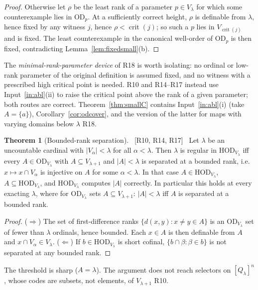\documentclass[11pt,letterpaper]{article}
\theoremstyle{definition}
\newtheorem{theorem}[definition]{Theorem}
\numberwithin{equation}{section}
\newcommand{\HOD}{\mathrm{HOD}}
\newcommand{\OD}{\mathrm{OD}}
\newcommand{\crit}{\operatorname{crit}}
\newcommand{\src}[1]{\unskip\ {\normalfont\small\sffamily\color{Olive}[#1]}\ }
\newcommand{\R}[1]{\textsf{R#1}}
\begin{document}
\begin{proof}
Otherwise let $\rho$ be the least rank of a parameter $p\in V_\lambda$ for which some counterexample lies in $\OD_p$. At a sufficiently correct height, $\rho$ is definable from $\lambda$, hence fixed by any witness $j$, hence $\rho<\crit(j)$; so such a $p$ lies in $V_{\crit(j)}$ and is fixed. The least counterexample in the canonical well-order of $\OD_p$ is then fixed, contradicting Lemma~\ref{lem:fixedsmall}(b).
\end{proof}

The \emph{minimal-rank-parameter device} of \R{18} is worth isolating: no ordinal or low-rank parameter of the original definition is assumed fixed, and no witness with a prescribed high critical point is needed. \R{10} and \R{14}--\R{17} instead use Input~\ref{in:abl}(ii) to raise the critical point above the rank of a given parameter; both routes are correct. Theorem~\ref{thm:smallC} contains Input~\ref{in:abl}(i) (take $A=\{a\}$), Corollary~\ref{cor:odcover}, and the version of the latter for maps with varying domains below $\lambda$ \R{18}.

\begin{theorem}[Bounded-rank separation]\label{thm:pinning}\src{R10, R14, R17}
Let $\lambda$ be an uncountable cardinal with $|V_\alpha|<\lambda$ for all $\alpha<\lambda$. Then $\lambda$ is regular in $\HOD_{V_\lambda}$ iff every $A\in\OD_{V_\lambda}$ with $A\subseteq V_{\lambda+1}$ and $|A|<\lambda$ is separated at a bounded rank, i.e.\ $x\mapsto x\cap V_\alpha$ is injective on $A$ for some $\alpha<\lambda$. In that case $A\in\HOD_{V_\lambda}$, $A\subseteq\HOD_{V_\lambda}$, and $\HOD_{V_\lambda}$ computes $|A|$ correctly. In particular this holds at every exacting $\lambda$, where for $\OD_{V_\lambda}$ sets $A\subseteq V_{\lambda+1}$: $|A|<\lambda$ iff $A$ is separated at a bounded rank.
\end{theorem}

\begin{proof}
($\Rightarrow$) The set of first-difference ranks $\{d(x,y):x\ne y\in A\}$ is an $\OD_{V_\lambda}$ set of fewer than $\lambda$ ordinals, hence bounded. Each $x\in A$ is then definable from $A$ and $x\cap V_\alpha\in V_\lambda$. ($\Leftarrow$) If $b\in\HOD_{V_\lambda}$ is short cofinal, $\{b\cap\beta:\beta\in b\}$ is not separated at any bounded rank.
\end{proof}

The threshold is sharp ($A=\lambda$). The argument does not reach selectors on $[Q_\lambda]^n$, whose codes are subsets, not elements, of $V_{\lambda+1}$ \R{10}.
\end{document}

